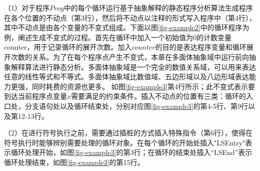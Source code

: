 
%
%
%
%


（1）对于程序$Prog$中的每个循环运行基于抽象解释的静态程序分析算法生成程序在各个位置的不动点（第3行），然后将不动点以注释的形式写入程序中（第4行），其中不动点是由各个变量的不变式组成。下面以图\ref{fig-example2}中的循环程序为例，阐述生成不变式的过程。首先在循环中加入一个初始值为0的计数变量counter，用于记录循环的展开次数。加入$counter$的目的是表达程序变量和循环展开次数的关系。为了在每个程序点产生不变式，本章在多面体抽象域中运行前向抽象解释算法进行静态分析。多面体抽象域是一个完全的数值关系域，可以用来表达任意的线性等式和不等式。多面体抽象域比数值域、五边形域以及八边形域表达能力更强，同时耗费的资源也更多。
如图\ref{fig-example3}第4行所示；此不变式表示要到达当前程序点变量$x$需要满足的约束条件。插入不动点的位置有三类：循环的入口处，分支语句处以及循环结束处，分别对应图\ref{fig-example3}的第4-5行、第9行以及第12-13行。

（2）在进行符号执行之前，需要通过插桩的方式插入特殊指令（第6行），使得在符号执行时能够辨别需要处理的循环对象。在每个循环的开始处插入"LSEntry"表示循环处理开始，如图\ref{fig-example3}的第3行；在循环的结束处插入“LSEnd”表示循环处理结束，如图\ref{fig-example3}的第15行。

